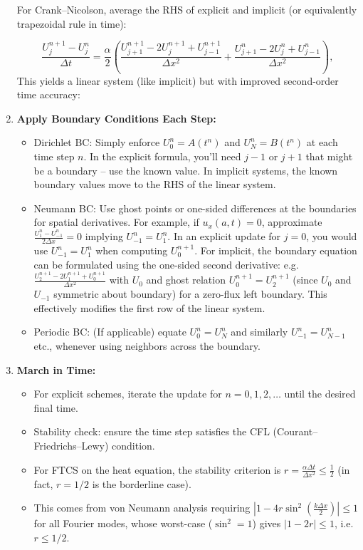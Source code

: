 \documentclass[a4paper,11pt]{article}
\begin{document}
\begin{enumerate}
          \medskip

          For Crank--Nicolson, average the RHS of explicit and implicit (or equivalently trapezoidal rule in time):

          \[
              \frac{U_j^{n+1}-U_j^n}{\Delta t} = \frac{\alpha}{2}\left(\frac{U_{j+1}^{n+1} - 2U_j^{n+1} + U_{j-1}^{n+1}}{\Delta x^2} + \frac{U_{j+1}^n - 2U_j^n + U_{j-1}^n}{\Delta x^2}\right),
          \]
          This yields a linear system (like implicit) but with improved second-order time accuracy:
    \item \textbf{Apply Boundary Conditions Each Step:}
          \begin{itemize}
              \item Dirichlet BC: Simply enforce $U_0^n = A(t^n)$ and $U_N^n = B(t^n)$ at each time step $n$. In the explicit formula, you’ll need $j-1$ or $j+1$ that might be a boundary -- use the known value. In implicit systems, the known boundary values move to the RHS of the linear system.
              \item Neumann BC: Use ghost points or one-sided differences at the boundaries for spatial derivatives. For example, if $u_x(a,t)=0$, approximate $\frac{U_1^n - U_{-1}^n}{2\Delta x}=0$ implying $U_{-1}^n = U_1^n$. In an explicit update for $j=0$, you would use $U_{-1}^n = U_1^n$ when computing $U_0^{n+1}$. For implicit, the boundary equation can be formulated using the one-sided second derivative: e.g. $\frac{U_2^{n+1}-2U_1^{n+1}+U_0^{n+1}}{\Delta x^2}$ with $U_0$ and ghost relation $U_0^{n+1}=U_2^{n+1}$ (since $U_0$ and $U_{-1}$ symmetric about boundary) for a zero-flux left boundary. This effectively modifies the first row of the linear system.
              \item Periodic BC: (If applicable) equate $U_0^n = U_N^n$ and similarly $U_{-1}^n = U_{N-1}^n$ etc., whenever using neighbors across the boundary.
          \end{itemize}
    \item \textbf{March in Time:}
          \begin{itemize}
              \item For explicit schemes, iterate the update for $n=0,1,2,\dots$ until the desired final time.
              \item Stability check: ensure the time step satisfies the CFL (Courant--Friedrichs--Lewy) condition.
              \item For FTCS on the heat equation, the stability criterion is $r = \frac{\alpha \Delta t}{\Delta x^2} \le \frac{1}{2}$ (in fact, $r=1/2$ is the borderline case)\cite{ddcampayo}.
              \item This comes from von Neumann analysis requiring $|1-4r\sin^2(\frac{k\Delta x}{2})|\le 1$ for all Fourier modes, whose worst-case ($\sin^2=1$) gives $|1-2r|\le 1$, i.e. $r\le 1/2$.


\end{itemize}
\end{enumerate}
\end{document}
